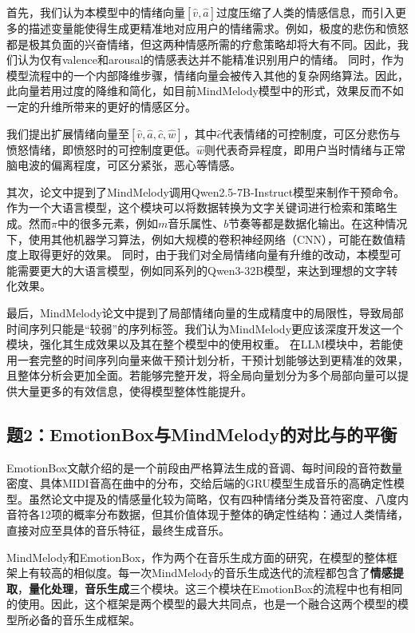 \documentclass[12pt, fontset=windows]{ctexart}
\begin{document}
首先，我们认为本模型中的情绪向量$[\hat{v}, \hat{a}]$过度压缩了人类的情感信息，而引入更多的描述变量能使得生成更精准地对应用户的情绪需求。例如，极度的悲伤和愤怒都是极其负面的兴奋情绪，但这两种情感所需的疗愈策略却将大有不同。因此，我们认为仅有valence和arousal的情感表达并不能精准识别用户的情绪。
同时，作为模型流程中的一个内部降维步骤，情绪向量会被传入其他的复杂网络算法。因此，此向量若用过度的降维和简化，如目前MindMelody模型中的形式，效果反而不如一定的升维所带来的更好的情感区分。

我们提出扩展情绪向量至$[\hat{v}, \hat{a},\hat{c},\hat{w}]$，其中$\hat{c}$代表情绪的可控制度，可区分悲伤与愤怒情绪，即愤怒时的可控制度更低。$\hat{w}$则代表奇异程度，即用户当时情绪与正常脑电波的偏离程度，可区分紧张，恶心等情感。

其次，论文中提到了MindMelody调用Qwen2.5-7B-Instruct模型来制作干预命令。作为一个大语言模型，这个模块可以将数据转换为文字关键词进行检索和策略生成。然而$\pi$中的很多元素，例如$m$音乐属性、$b$节奏等都是数据化输出。在这种情况下，使用其他机器学习算法，例如大规模的卷积神经网络（CNN），可能在数值精度上取得更好的效果。
同时，由于我们对全局情绪向量有升维的改动，本模型可能需要更大的大语言模型，例如同系列的Qwen3-32B模型，来达到理想的文字转化效果。

最后，MindMelody论文中提到了局部情绪向量的生成精度中的局限性，导致局部时间序列只能是“较弱”的序列标签。我们认为MindMelody更应该深度开发这一个模块，强化其生成效果以及其在整个模型中的使用权重。
在LLM模块中，若能使用一套完整的时间序列向量来做干预计划分析，干预计划能够达到更精准的效果，且整体分析会更加全面。若能够完整开发，将全局向量划分为多个局部向量可以提供大量更多的有效信息，使得模型整体性能提升。

\subsection{题2：EmotionBox与MindMelody的对比与的平衡}
EmotionBox文献介绍的是一个前段由严格算法生成的音调、每时间段的音符数量密度、具体MIDI音高在曲中的分布，交给后端的GRU模型生成音乐的高确定性模型。虽然论文中提及的情感量化较为简略，仅有四种情绪分类及音符密度、八度内音符各12项的概率分布数据，但其价值体现于整体的确定性结构：通过人类情绪，直接对应至具体的音乐特征，最终生成音乐。

MindMelody和EmotionBox，作为两个在音乐生成方面的研究，在模型的整体框架上有较高的相似度。每一次MindMelody的音乐生成迭代的流程都包含了\textbf{情感提取}，\textbf{量化处理}，\textbf{音乐生成}三个模块。这三个模块在EmotionBox的流程中也有相同的使用。因此，这个框架是两个模型的最大共同点，也是一个融合这两个模型的模型所必备的音乐生成框架。
\end{document}
